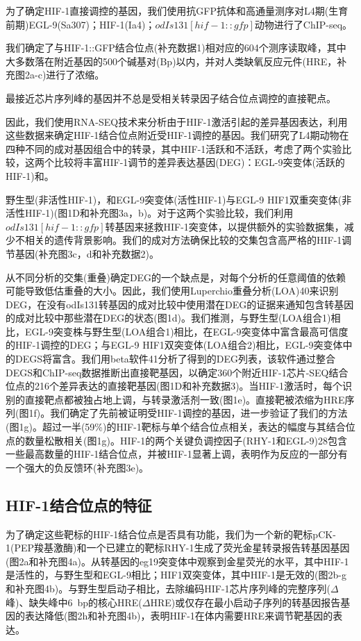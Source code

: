 \documentclass{ctexart}
\begin{document}
    为了确定HIF-1直接调控的基因，我们使用抗GFP抗体和高通量测序对L4期(生育前期)EGL-9(Sa307)；HIF-1(Ia4)；$odIs131[hif-1::gfp]$动物进行了ChIP-seq。
    
    我们确定了与HIF-1::GFP结合位点(补充数据1)相对应的604个测序读取峰，其中大多数落在附近基因的500个碱基对(Bp)以内，并对人类缺氧反应元件(HRE，补充图2a-c)进行了浓缩。
    
    最接近芯片序列峰的基因并不总是受相关转录因子结合位点调控的直接靶点。
    
    因此，我们使用RNA-SEQ技术来分析由于HIF-1激活引起的差异基因表达，利用这些数据来确定HIF-1结合位点附近受HIF-1调控的基因。我们研究了L4期动物在四种不同的成对基因组合中的转录，其中HIF-1活跃和不活跃，考虑了两个实验比较，这两个比较将丰富HIF-1调节的差异表达基因(DEG)：EGL-9突变体(活跃的HIF-1)和。
    
    野生型(非活性HIF-1)，和EGL-9突变体(活性HIF-1)与EGL-9 HIF1双重突变体(非活性HIF-1)(图1D和补充图3a，b)。对于这两个实验比较，我们利用$odIs131[hif-1::gfp]$转基因来拯救HIF-1突变体，以提供额外的实验数据集，减少不相关的遗传背景影响。我们的成对方法确保比较的交集包含高严格的HIF-1调节基因(补充图3c，d和补充数据2)。
    
    从不同分析的交集(重叠)确定DEG的一个缺点是，对每个分析的任意阈值的依赖可能导致低估重叠的大小。因此，我们使用Luperchio重叠分析(LOA)40来识别DEG，在没有odIs131转基因的成对比较中使用潜在DEG的证据来通知包含转基因的成对比较中那些潜在DEG的状态(图1d)。我们推测，与野生型(LOA组合1)相比，EGL-9突变株与野生型(LOA组合1)相比，在EGL-9突变体中富含最高可信度的HIF-1调控的DEG；与EGL-9 HIF1双突变体(LOA组合2)相比，EGL-9突变体中的DEGS将富含。我们用beta软件41分析了得到的DEG列表，该软件通过整合DEGS和ChIP-seq数据推断出直接靶基因，以确定360个附近HIF-1芯片-SEQ结合位点的216个差异表达的直接靶基因(图1D和补充数据3)。当HIF-1激活时，每个识别的直接靶点都被独占地上调，与转录激活剂一致(图1e)。直接靶被浓缩为HRE序列(图1f)。我们确定了先前被证明受HIF-1调控的基因，进一步验证了我们的方法(图1g)。超过一半(59\%)的HIF-1靶标与单个结合位点相关，表达的幅度与其结合位点的数量松散相关(图1g)。HIF-1的两个关键负调控因子(RHY-1和EGL-9)28包含一些最高数量的HIF-1结合位点，并被HIF-1显著上调，表明作为反应的一部分有一个强大的负反馈环(补充图3e)。

    \subsection{HIF-1结合位点的特征}

    为了确定这些靶标的HIF-1结合位点是否具有功能，我们为一个新的靶标pCK-1(PEP羧基激酶)和一个已建立的靶标RHY-1生成了荧光金星转录报告转基因基因(图2a和补充图4a)。从转基因的eg19突变体中观察到金星荧光的水平，其中HIF-1是活性的，与野生型和EGL-9相比；HIF1双突变体，其中HIF-1是无效的(图2b-g和补充图4b)。与野生型启动子相比，去除编码HIF-1芯片序列峰的完整序列($\Delta$峰)、缺失峰中6~bp的核心HRE($\Delta$HRE)或仅存在最小启动子序列的转基因报告基因的表达降低(图2h和补充图4b)，表明HIF-1在体内需要HRE来调节靶基因的表达。
\end{document}
